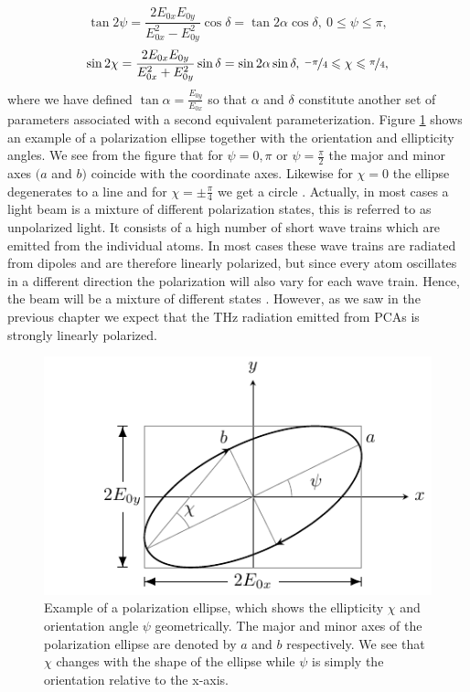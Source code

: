 \begin{equation}
    \label{eq:ellipse_orientation}
    \tan 2\psi = \frac{2E_{0x}E_{0y}}{E_{0x}^2 - E_{0y}^2}\cos \delta = 
    \tan 2\alpha \cos \delta
    ,\: 0\leqslant\psi\leqslant\pi,
\end{equation}
\begin{equation}
    \label{eq:ellipse_ellipticity}
    \sin 2\chi = \frac{2E_{0x}E_{0y}}{E_{0x}^2 + E_{0y}^2}\sin \delta = 
    \sin 2\alpha \sin \delta,\: \nicefrac{-\pi}{4}\leqslant\chi\leqslant\nicefrac{\pi}{4},
\end{equation}
where we have defined $\tan \alpha = \frac{E_{0y}}{E_{0x}}$ so that $\alpha$ and $\delta$ constitute another set of parameters associated with a second equivalent parameterization. Figure \ref{fig:pol_ellipse} shows an example of a polarization ellipse together with the orientation and ellipticity angles. We see from the figure that for $\psi = 0, \pi$ or $\psi = \frac{\pi}{2}$ the major and minor axes $(a$ and $b)$ coincide with the coordinate axes. Likewise for $\chi = 0$ the ellipse degenerates to a line and for $\chi = \pm\frac{\pi}{4}$ we get a circle \cite{Collett2009}. Actually, in most cases a light beam is a mixture of different polarization states, this is referred to as unpolarized light. It consists of a high number of short wave trains which are emitted from the individual atoms. In most cases these wave trains are radiated from dipoles and are therefore linearly polarized, but since every atom oscillates in a different direction the polarization will also vary for each wave train. Hence, the beam will be a mixture of different states \cite{Roth2019}. However, as we saw in the previous chapter we expect that the THz radiation emitted from PCAs is strongly linearly polarized.
\begin{figure}[h]
    \centering
    \includegraphics[scale=1.0]{images/theory/tikz_pol_ellipse.pdf}
    \caption{Example of a polarization ellipse, which shows the ellipticity $\chi$ and orientation angle $\psi$ geometrically. The major and minor axes of the polarization ellipse are denoted by $a$ and $b$ respectively. We see that $\chi$ changes with the shape of the ellipse while $\psi$ is simply the orientation relative to the x-axis.}
    \label{fig:pol_ellipse}
\end{figure}


